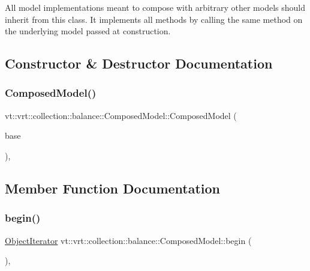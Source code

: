All model implementations meant to compose with arbitrary other models should inherit from this class. It implements all methods by calling the same method on the underlying model passed at construction. 

\subsection{Constructor \& Destructor Documentation}
\mbox{\label{classvt_1_1vrt_1_1collection_1_1balance_1_1_composed_model_a84b77c1fceb9e07a0706b896a4d9e9c9}} 
\subsubsection{\texorpdfstring{Composed\+Model()}{ComposedModel()}}
{\footnotesize\ttfamily vt\+::vrt\+::collection\+::balance\+::\+Composed\+Model\+::\+Composed\+Model (\begin{DoxyParamCaption}\item[{std\+::shared\+\_\+ptr$<$ \hyperlink{classvt_1_1vrt_1_1collection_1_1balance_1_1_load_model}{Load\+Model} $>$}]{base }\end{DoxyParamCaption})\hspace{0.3cm}{\ttfamily [inline]}, {\ttfamily [explicit]}}



\subsection{Member Function Documentation}
\mbox{\label{classvt_1_1vrt_1_1collection_1_1balance_1_1_composed_model_a8f34205887c08a22a1e5bef6ee358f2b}} 
\subsubsection{\texorpdfstring{begin()}{begin()}}
{\footnotesize\ttfamily \hyperlink{classvt_1_1vrt_1_1collection_1_1balance_1_1_object_iterator}{Object\+Iterator} vt\+::vrt\+::collection\+::balance\+::\+Composed\+Model\+::begin (\begin{DoxyParamCaption}{ }\end{DoxyParamCaption})\hspace{0.3cm}{\ttfamily [override]}, {\ttfamily [virtual]}}



